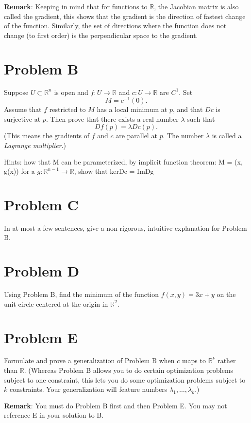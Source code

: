 \documentclass[lang=cn,11pt]{template}
\begin{document}
\textbf{Remark}: Keeping in mind that for functions to $\mathbb{R}$, the Jacobian matrix is also called the gradient, this shows that the gradient is the direction of fastest change of the function. Similarly, the set of directions where the function does not change (to first order) is the perpendicular space to the gradient.

\section*{Problem B}
Suppose $U \subset \mathbb{R}^n$ is open and $f : U \to \mathbb{R}$ and $c : U \to \mathbb{R}$ are $C^1$. Set
\[
M = c^{-1}(0).
\]
Assume that $f$ restricted to $M$ has a local minimum at $p$, and that $Dc$ is surjective at $p$. Then prove that there exists a real number $\lambda$ such that
\[
Df(p) = \lambda Dc(p).
\]
(This means the gradients of $f$ and $c$ are parallel at $p$. The number $\lambda$ is called a \textit{Lagrange multiplier}.)

Hints: how that M can be parameterized, by implicit function theorem: M = {(x, g(x))} for a $g: \mathbb{R}^{n-1} \rightarrow \mathbb{R}$, show that kerDc = ImDg


\section*{Problem C}
In at most a few sentences, give a non-rigorous, intuitive explanation for Problem B.

\section*{Problem D}
Using Problem B, find the minimum of the function $f(x, y) = 3x + y$ on the unit circle centered at the origin in $\mathbb{R}^2$.

\section*{Problem E}
Formulate and prove a generalization of Problem B when $c$ maps to $\mathbb{R}^k$ rather than $\mathbb{R}$. (Whereas Problem B allows you to do certain optimization problems subject to one constraint, this lets you do some optimization problems subject to $k$ constraints. Your generalization will feature numbers $\lambda_1, \dots, \lambda_k$.)

\textbf{Remark}: You must do Problem B first and then Problem E. You may not reference E in your solution to B.
\end{document}
